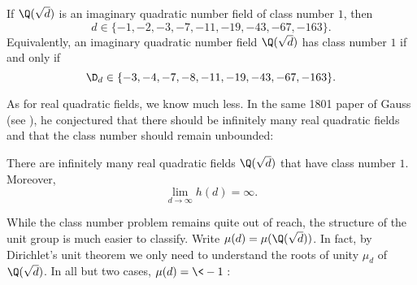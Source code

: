     \begin{theorem}
      If $\Q(\sqrt{d})$ is an imaginary quadratic number field of class number $1$, then
      \[
        d \in \{-1,-2,-3,-7,-11,-19,-43,-67,-163\}.
      \]
      Equivalently, an imaginary quadratic number field $\Q(\sqrt{d})$ has class number $1$ if and only if
      \[
        \D_{d} \in \{-3,-4,-7,-8,-11,-19,-43,-67,-163\}.
      \]
    \end{theorem}

    As for real quadratic fields, we know much less. In the same 1801 paper of Gauss (see \cite{gauss1801disquisitiones}), he conjectured that there should be infinitely many real quadratic fields and that the class number should remain unbounded:

    \begin{conjecture}
      There are infinitely many real quadratic fields $\Q(\sqrt{d})$ that have class number $1$. Moreover,
      \[
        \lim_{d \to \infty}h(d) = \infty.
      \]
    \end{conjecture}

    While the class number problem remains quite out of reach, the structure of the unit group is much easier to classify. Write $\mu(d) = \mu(\Q(\sqrt{d}))$. In fact, by Dirichlet's unit theorem we only need to understand the roots of unity $\mu_{d}$ of $\Q(\sqrt{d})$. In all but two cases, $\mu(d) = \<-1\>$:

